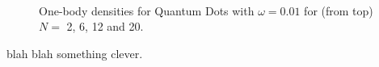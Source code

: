 \begin{figure}
\begin{center}
   \\
  \caption{One-body densities for Quantum Dots with $\omega=0.01$ for (from top) $N=$ 2, 6, 12 and 20.}
  \label{fig:OBD_pure_w001}
 \end{center}
\end{figure}

blah blah something clever.

 
 



